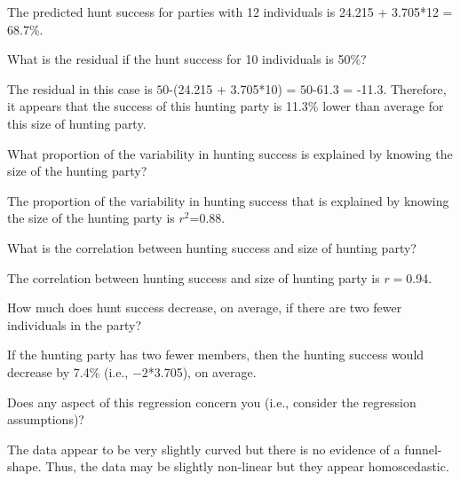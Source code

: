 \documentclass[10pt,openany]{book}\usepackage[]{graphicx}\usepackage[]{color}
\begin{document}
\begin{QAlist}
  \begin{QAlist}
    \item The predicted hunt success for parties with 12 individuals is 24.215 + 3.705*12 = 68.7\%.
  \end{QAlist}
  \item What is the residual if the hunt success for 10 individuals is 50\%?
  \begin{QAlist}
    \item The residual in this case is $50$-(24.215 + 3.705*10) = $50$-61.3 = -11.3.  Therefore, it appears that the success of this hunting party is 11.3\% lower than average for this size of hunting party.
  \end{QAlist}
  \item What proportion of the variability in hunting success is explained by knowing the size of the hunting party?
  \begin{QAlist}
    \item The proportion of the variability in hunting success that is explained by knowing the size of the hunting party is $r^{2}$=0.88.
  \end{QAlist}
  \item What is the correlation between hunting success and size of hunting party?
  \begin{QAlist}
    \item The correlation between hunting success and size of hunting party is $r=$0.94.
  \end{QAlist}
  \item How much does hunt success decrease, on average, if there are two fewer individuals in the party?
  \begin{QAlist}
    \item If the hunting party has two fewer members, then the hunting success would decrease by 7.4\% (i.e., $-2$*3.705), on average.
  \end{QAlist}
  \item Does any aspect of this regression concern you (i.e., consider the regression assumptions)?
  \begin{QAlist}
    \item The data appear to be very slightly curved but there is no evidence of a funnel-shape.  Thus, the data may be slightly non-linear but they appear homoscedastic.
  \end{QAlist}
\end{QAlist}

\end{document}
